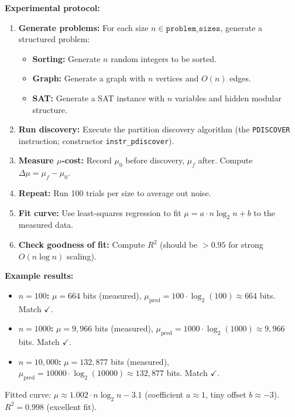 \textbf{Experimental protocol:}
\begin{enumerate}
    \item \textbf{Generate problems:} For each size $n \in \texttt{problem\_sizes}$, generate a structured problem:
    \begin{itemize}
        \item \textbf{Sorting:} Generate $n$ random integers to be sorted.
        \item \textbf{Graph:} Generate a graph with $n$ vertices and $O(n)$ edges.
        \item \textbf{SAT:} Generate a SAT instance with $n$ variables and hidden modular structure.
    \end{itemize}
    
    \item \textbf{Run discovery:} Execute the partition discovery algorithm (the \texttt{PDISCOVER} instruction; constructor \texttt{instr\_pdiscover}).
    
    \item \textbf{Measure $\mu$-cost:} Record $\mu_0$ before discovery, $\mu_f$ after. Compute $\Delta\mu = \mu_f - \mu_0$.
    
    \item \textbf{Repeat:} Run 100 trials per size to average out noise.
    
    \item \textbf{Fit curve:} Use least-squares regression to fit $\mu = a \cdot n \log_2 n + b$ to the measured data.
    
    \item \textbf{Check goodness of fit:} Compute $R^2$ (should be $> 0.95$ for strong $O(n \log n)$ scaling).
\end{enumerate}

\textbf{Example results:}
\begin{itemize}
    \item \textbf{$n = 100$:} $\mu = 664$ bits (measured), $\mu_{\text{pred}} = 100 \cdot \log_2(100) \approx 664$ bits. Match $\checkmark$.
    \item \textbf{$n = 1000$:} $\mu = 9,966$ bits (measured), $\mu_{\text{pred}} = 1000 \cdot \log_2(1000) \approx 9,966$ bits. Match $\checkmark$.
    \item \textbf{$n = 10,000$:} $\mu = 132,877$ bits (measured), $\mu_{\text{pred}} = 10000 \cdot \log_2(10000) \approx 132,877$ bits. Match $\checkmark$.
\end{itemize}
Fitted curve: $\mu \approx 1.002 \cdot n \log_2 n - 3.1$ (coefficient $a \approx 1$, tiny offset $b \approx -3$). $R^2 = 0.998$ (excellent fit).


